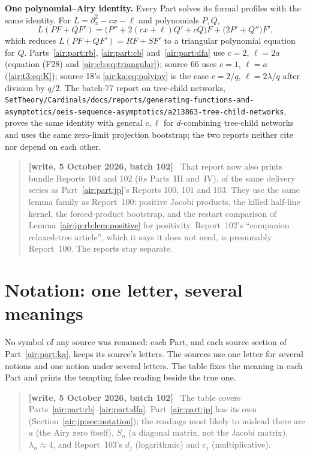 \documentclass[11pt,letterpaper]{article}
\numberwithin{equation}{section}
\theoremstyle{remark}
\newenvironment{writenotejp}{\par\smallskip\begin{quote}\small\textbf{[write, 5 October 2026, batch 102]}\ }{\end{quote}\smallskip}
\newcommand{\repopath}[1]{\nolinkurl{#1}}
\begin{document}
\textbf{One polynomial--Airy identity.} Every Part solves its formal profiles with the same identity. For $L=\partial_x^2-cx-\ell$ and polynomials $P,Q$,
\[
L(PF+QF')=\bigl(P''+2(cx+\ell)Q'+cQ\bigr)F+\bigl(2P'+Q''\bigr)F',
\]
which reduces $L(PF+QF')=RF+SF'$ to a triangular polynomial equation for $Q$. Parts~\ref{air:part:rb}, \ref{air:part:cb} and~\ref{air:part:dfa} use $c=2$, $\ell=2a$ (equation (F28) and \eqref{air:cb:eq:triangular}); source 66 uses $c=1$, $\ell=a$ (\eqref{air:t3:eq:K}); source 18's \eqref{air:ka:eq:polyinv} is the case $c=2/q$, $\ell=2\lambda/q$ after division by $q/2$. The batch-77 report on tree-child networks, \repopath{SetTheory/Cardinals/docs/reports/generating-functions-and-asymptotics/oeis-sequence-asymptotics/a213863-tree-child-networks}, proves the same identity with general $c,\ell$ for $d$-combining tree-child networks and uses the same zero-limit projection bootstrap; the two reports neither cite nor depend on each other.
\begin{writenotejp}
That report now also prints bundle Reports 104 and 102 (its Parts~III and~IV), of the same delivery series as Part~\ref{air:part:jp}'s Reports 100, 101 and 103. They use the same lemma family as Report~100: positive Jacobi products, the killed half-line kernel, the forced-product bootstrap, and the restart comparison of Lemma~\ref{air:jp:rb:lem:positive} for positivity. Report~102's ``companion relaxed-tree article'', which it says it does not need, is presumably Report~100. The reports stay separate.
\end{writenotejp}

\section*{Notation: one letter, several meanings}
\label{air:guide:notation}
No symbol of any source was renamed: each Part, and each source section of Part~\ref{air:part:ka}, keeps its source's letters. The sources use one letter for several notions and one notion under several letters. The table fixes the meaning in each Part and prints the tempting false reading beside the true one.
\begin{writenotejp}
The table covers Parts~\ref{air:part:rb}--\ref{air:part:dfa}. Part~\ref{air:part:jp} has its own (Section~\ref{air:jp:sec:notation}); the readings most likely to mislead there are $a$ (the Airy zero itself), $S_n$ (a diagonal matrix, not the Jacobi matrix), $\lambda_n\approx4$, and Report~103's $d_j$ (logarithmic) and $c_j$ (multiplicative).
\end{writenotejp}
\end{document}
